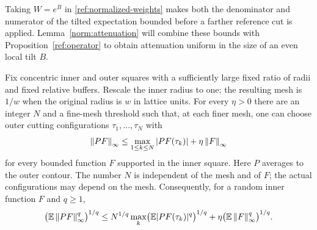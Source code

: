 Taking $W=e^B$ in \eqref{ref:normalized-weights} makes both the denominator
and numerator of the tilted expectation bounded before a farther
reference cut is applied.  Lemma~\ref{norm:attenuation} will combine these
bounds with Proposition~\ref{ref:operator} to obtain attenuation uniform
in the size of an even local tilt $B$.

\begin{lemma}\label{ref:dictionary}
Fix concentric inner and outer squares with a sufficiently large fixed
ratio of radii and fixed relative buffers.  Rescale the inner radius to
one; the resulting mesh is $1/w$ when the original radius is $w$
in lattice units.  For every $\eta>0$ there are
an integer $N$ and a fine-mesh threshold such that, at each finer mesh,
one can choose outer cutting configurations $\tau_1,\ldots,\tau_N$ with
\begin{equation}\label{ref:finite-tests}
 \left\lVert PF\right\rVert_\infty
      \le \max_{1\le k\le N}|PF(\tau_k)|+\eta\left\lVert F\right\rVert_\infty
\end{equation}
for every bounded function $F$ supported in the inner square.  Here $P$
averages to the outer contour.  The number $N$ is independent of the mesh
and of $F$; the actual configurations may depend on the mesh.  Consequently,
for a random inner function $F$ and $q\ge1$,
\begin{equation}\label{ref:finite-moment-tests}
 \bigl(\mathbb E\left\lVert PF\right\rVert_\infty^q\bigr)^{1/q}
 \le N^{1/q}\max_k\bigl(\mathbb E|PF(\tau_k)|^q\bigr)^{1/q}
       +\eta\bigl(\mathbb E\left\lVert F\right\rVert_\infty^q\bigr)^{1/q}.
\end{equation}
\end{lemma}

